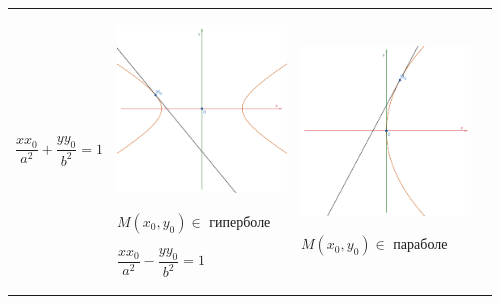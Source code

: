 \documentclass[twoside]{book}
\begin{document}
\begin{center}
\begin{longtable}{|p{2.5cm}|p{4.5cm}|p{4.5cm}|p{4.5cm}|}
        \(\dfrac{x x_0}{a^2} + \dfrac{y y_0}{b^2} = 1\)
         &
        \begin{center}
            \includegraphics[width=4.5cm]{Images/Chapter_1/3-1-14.png}
        \end{center}
        \(M(x_0, y_0) \in\) гиперболе

        \(\dfrac{x x_0}{a^2} - \dfrac{y y_0}{b^2} = 1\)
         &
        \begin{center}
            \includegraphics[width=4.5cm]{Images/Chapter_1/3-1-15.png}
        \end{center}
        \(M(x_0, y_0) \in\) параболе


\end{longtable}
\end{center}
\end{document}

